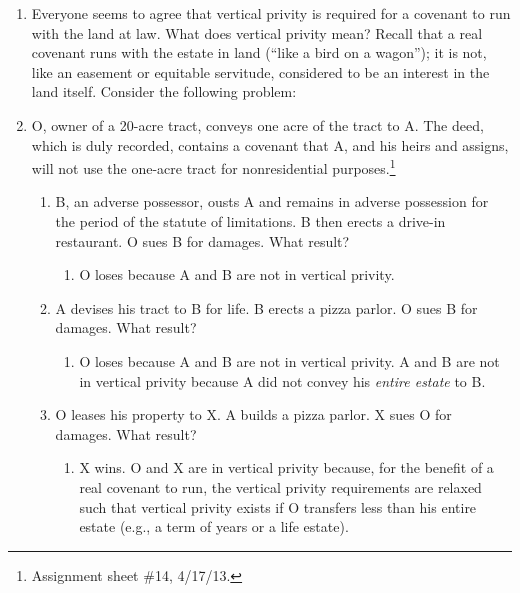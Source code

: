 \begin{enumerate}
    \item Everyone seems to agree that vertical privity is required for a 
    covenant to run with the land at law. What does vertical privity mean? 
    Recall that a real covenant runs with the estate in land (``like a bird on 
    a wagon''); it is not, like an easement or equitable servitude, considered 
    to be an interest in the land itself. Consider the following problem:
    \item O, owner of a 20-acre tract, conveys one acre of the tract to A.  
    The deed, which is duly recorded, contains a covenant that A, and his 
    heirs and assigns, will not use the one-acre tract for nonresidential 
    purposes.\footnote{Assignment sheet \#14, 4/17/13.}
    \begin{enumerate}
        \item B, an adverse possessor, ousts A and remains in adverse 
        possession for the period of the statute of limitations. B then 
        erects a drive-in restaurant. O sues B for damages.  What result?  
        \begin{enumerate}
            \item O loses because A and B are not in vertical privity.
        \end{enumerate}
        \item A devises his tract to B for life. B erects a pizza parlor. O 
        sues B for damages. What result?
        \begin{enumerate}
            \item O loses because A and B are not in vertical privity. A and B 
            are not in vertical privity because A did not convey his 
            \emph{entire estate} to B.
        \end{enumerate}
        \item O leases his property to X. A builds a pizza parlor. X sues O 
        for damages. What result?
        \begin{enumerate}
            \item X wins. O and X are in vertical privity because, for the 
            benefit of a real covenant to run, the vertical privity 
            requirements are relaxed such that vertical privity exists if O 
            transfers less than his entire estate (e.g., a term of years or a 
            life estate).
        \end{enumerate}
    \end{enumerate}
\end{enumerate}

